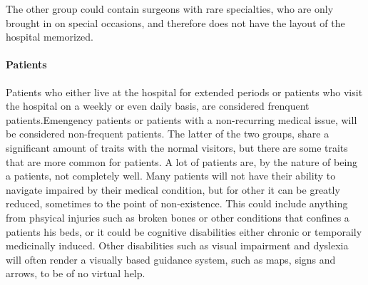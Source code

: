 The other group could contain surgeons with rare specialties, who are only brought in on special occasions, and therefore does not have the layout of the hospital memorized.

\paragraph{Patients} %

Patients who either live at the hospital for extended periods or patients who visit the hospital on a weekly or even daily basis, are considered frenquent patients.Emengency patients or patients with a non-recurring medical issue, will be considered non-frequent patients. The latter of the two groups, share a significant amount of traits with the normal visitors, but there are some traits that are more common for patients.
A lot of patients are, by the nature of being a patients, not completely well. Many patients will not have their ability to navigate impaired by their medical condition, but for other it can be greatly reduced, sometimes to the point of non-existence. This could include anything from phsyical injuries such as broken bones or other conditions that confines a patients his beds, or it could be cognitive disabilities either chronic or temporaily medicinally induced. Other disabilities such as visual impairment and dyslexia will often render a visually based guidance system, such as maps, signs and arrows, to be of no virtual help.



